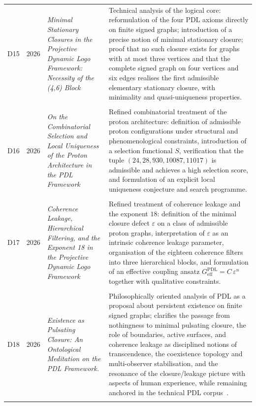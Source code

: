 \documentclass[11pt,a4paper]{article}
\newcommand{\PDL}{\mathrm{PDL}}
\begin{document}
\begin{longtable}{@{}llL{4cm}p{9.5cm}@{}}
D15 & 2026 & \textit{Minimal Stationary Closures in the Projective Dynamic Logo Framework: Necessity of the (4,6) Block} &
Technical analysis of the logical core: reformulation of the four PDL axioms directly on finite signed graphs; introduction of a precise notion of minimal stationary closure; proof that no such closure exists for graphs with at most three vertices and that the complete signed graph on four vertices and six edges realises the first admissible elementary stationary closure, with minimality and quasi-uniqueness properties. \citep{Minimal_Stationary_Closures_2026} \\\\[0.5em]

D16 & 2026 & \textit{On the Combinatorial Selection and Local Uniqueness of the Proton Architecture in the PDL Framework} &
Refined combinatorial treatment of the proton architecture: definition of admissible proton configurations under structural and phenomenological constraints, introduction of a selection functional $S$, verification that the tuple $(24,28,930,10087,11017)$ is admissible and achieves a high selection score, and formulation of an explicit local uniqueness conjecture and search programme. \citep{Proton_Local_Uniqueness_2026,Combinatorial_Proton_v2_2026} \\\\[0.5em]

D17 & 2026 & \textit{Coherence Leakage, Hierarchical Filtering, and the Exponent 18 in the Projective Dynamic Logo Framework} &
Refined treatment of coherence leakage and the exponent $18$: definition of the minimal closure defect $\varepsilon$ on a class of admissible proton graphs, interpretation of $\varepsilon$ as an intrinsic coherence leakage parameter, organisation of the eighteen coherence filters into three hierarchical blocks, and formulation of an effective coupling ansatz $G_{\mathrm{eff}}^{\PDL}=C\,\varepsilon^{n}$ together with qualitative constraints. \citep{Coherence_Leakage_18_2026,Topological_Reformulation_PDL_2026,Effective_Fields_PDL_2026} \\\\[0.5em]

D18 &
2026 &
\emph{Existence as Pulsating Closure: An Ontological Meditation on the PDL Framework.} & 
Philosophically oriented analysis of PDL as a proposal about persistent existence on finite signed graphs; clarifies the passage from nothingness to minimal pulsating closure, the role of boundaries, active surfaces, and coherence leakage as disciplined notions of transcendence, the coexistence topology and multi-observer stabilisation, and the resonance of the closure/leakage picture with aspects of human experience, while remaining anchored in the technical PDL corpus~\citep{ExistencePulsatingClosure2026}.\\\\[0.4em]


\end{longtable}
\end{document}
